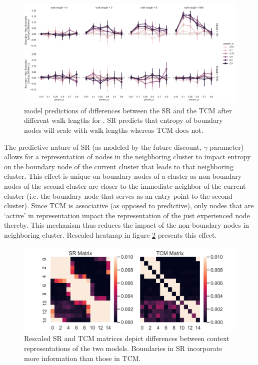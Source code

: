 \begin{figure}[ht]
	\centering
	\includegraphics[width = \textwidth]{chapter_notebooks/chapter_2/figures/SR_TCM_walklength_boundary_nonboundary_entropydiff.png}
	\caption{ model predictions of differences between the SR and the TCM after different walk lengths for . SR predicts that entropy of boundary nodes will scale with walk lengths whereas TCM does not.}
	\label{fig:SR-TCM-walklength-boundary-nonboundary-entropydiff}
\end{figure}


The predictive nature of SR (as modeled by the future discount, $\gamma$ parameter) allows for a representation of nodes in the neighboring cluster to impact entropy on the boundary node of the current cluster that leads to that neighboring cluster. This effect is unique on boundary nodes of a cluster as non-boundary nodes of the second cluster are closer to the immediate neighbor of the current cluster (i.e. the boundary node that serves as an entry point to the second cluster). Since TCM is associative (as opposed to predictive), only nodes that are `active' in representation impact the representation of the just experienced node thereby. This mechanism thus reduces the impact of the non-boundary nodes in neighboring cluster. Rescaled heatmap in figure \ref{fig:zoomed-in-SRTCM-boundary-entropy} presents this effect.

\begin{figure}[ht]
	\centering
	\includegraphics[width = \textwidth]{chapter_notebooks/chapter_2/figures/SR_vs_TCM_Matrices_zoomed.png}
	\caption{Rescaled SR and TCM matrices depict differences between context representations of the two models. Boundaries in SR incorporate more information than those in TCM.}
	\label{fig:zoomed-in-SRTCM-boundary-entropy}
\end{figure}

